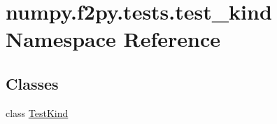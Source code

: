 \hypertarget{namespacenumpy_1_1f2py_1_1tests_1_1test__kind}{}\section{numpy.\+f2py.\+tests.\+test\+\_\+kind Namespace Reference}
\label{namespacenumpy_1_1f2py_1_1tests_1_1test__kind}
\subsection*{Classes}
\begin{DoxyCompactItemize}
\item 
class \hyperlink{classnumpy_1_1f2py_1_1tests_1_1test__kind_1_1TestKind}{Test\+Kind}
\end{DoxyCompactItemize}
